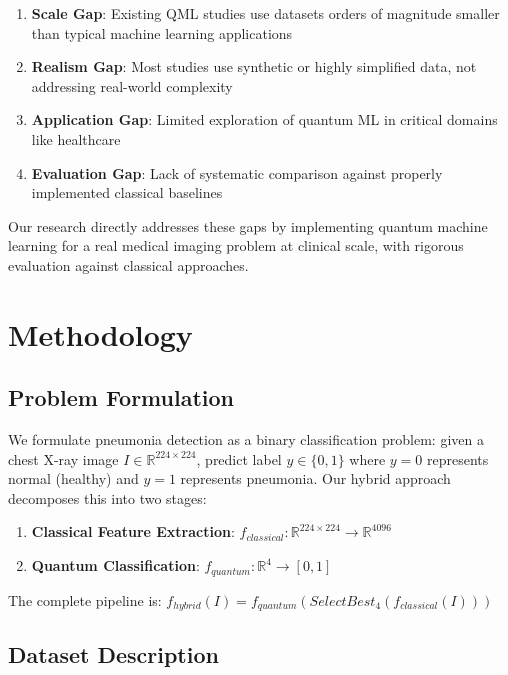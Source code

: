 \documentclass[conference]{IEEEtran}
\begin{document}
\begin{enumerate}
    \item \textbf{Scale Gap}: Existing QML studies use datasets orders of magnitude smaller than typical machine learning applications
    \item \textbf{Realism Gap}: Most studies use synthetic or highly simplified data, not addressing real-world complexity
    \item \textbf{Application Gap}: Limited exploration of quantum ML in critical domains like healthcare
    \item \textbf{Evaluation Gap}: Lack of systematic comparison against properly implemented classical baselines
\end{enumerate}

Our research directly addresses these gaps by implementing quantum machine learning for a real medical imaging problem at clinical scale, with rigorous evaluation against classical approaches.

\section{Methodology}
\label{sec:methodology}

\subsection{Problem Formulation}

We formulate pneumonia detection as a binary classification problem: given a chest X-ray image $I \in \mathbb{R}^{224 \times 224}$, predict label $y \in \{0, 1\}$ where $y=0$ represents normal (healthy) and $y=1$ represents pneumonia. Our hybrid approach decomposes this into two stages:

\begin{enumerate}
    \item \textbf{Classical Feature Extraction}: $f_{classical}: \mathbb{R}^{224 \times 224} \rightarrow \mathbb{R}^{4096}$
    \item \textbf{Quantum Classification}: $f_{quantum}: \mathbb{R}^{4} \rightarrow [0,1]$
\end{enumerate}

The complete pipeline is: $f_{hybrid}(I) = f_{quantum}(SelectBest_4(f_{classical}(I)))$

\subsection{Dataset Description}
\end{document}

